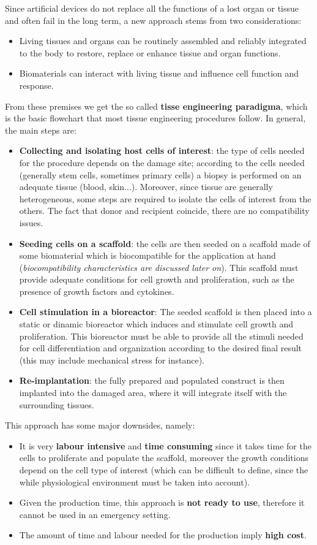 Since artificial devices do not replace all the functions of a lost organ or tissue and often fail in the
long term, a new approach stems from two considerations:
\begin{itemize}
  \item Living tissues and organs can be routinely assembled and reliably integrated to the body to restore, replace or enhance tissue and organ functions.
  \item Biomaterials can interact with living tissue and influence cell function and response.
\end{itemize}
From these premises we get the so called \textbf{tisse engineering paradigma}, which is the basic flowchart that most tissue engineering procedures follow. In general, the main steps are:
\begin{itemize}
  \item \textbf{Collecting and isolating host cells of interest}: the type of cells needed for the procedure depends on the damage site; according to the cells needed (generally stem cells, sometimes primary cells) a biopsy is performed on an adequate tissue (blood, skin...). Moreover, since tissue are generally heterogeneous, some steps are required to isolate the cells of interest from the others. The fact that donor and recipient coincide, there are no compatibility issues.
  \item \textbf{Seeding cells on a scaffold}: the cells are then seeded on a scaffold made of some biomaterial which is biocompatible for the application at hand (\textit{biocompatibility characteristics are discussed later on}). This scaffold must provide adequate conditions for cell growth and proliferation, such as the presence of growth factors and cytokines.
  \item \textbf{Cell stimulation in a bioreactor}: The seeded scaffold is then placed into a static or dinamic bioreactor which induces and stimulate cell growth and proliferation. This bioreactor must be able to provide all the stimuli needed for cell differentiation and organization according to the desired final result (this may include mechanical stress for instance).
  \item \textbf{Re-implantation}: the fully prepared and populated construct is then implanted into the damaged area, where it will integrate itself with the surrounding tissues.
\end{itemize}
This approach has some major downsides, namely:
\begin{itemize}
  \item It is very \textbf{labour intensive} and \textbf{time consuming} since it takes time for the cells to proliferate and populate the scaffold, moreover the growth conditions depend on the cell type of interest (which can be difficult to define, since the while physiological environment must be taken into account).
  \item Given the production time, this approach is \textbf{not ready to use}, therefore it cannot be used in an emergency setting.
  \item The amount of time and labour needed for the production imply \textbf{high cost}.
\end{itemize}
